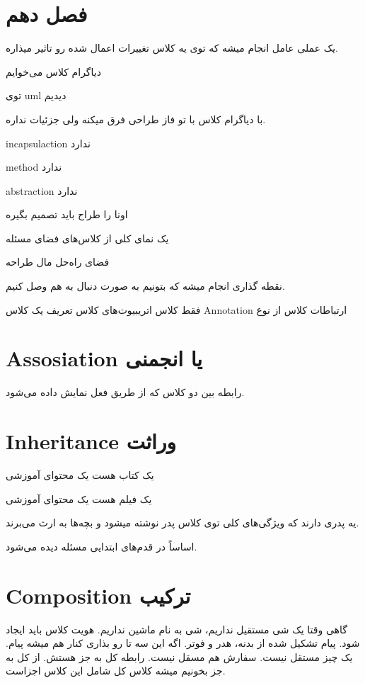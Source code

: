 \newpage

\section{فصل دهم}

یک عملی عامل انجام میشه که توی یه کلاس تغییرات اعمال شده رو تاثیر میذاره.

دیاگرام کلاس می‌خوایم

توی uml دیدیم

با دیاگرام کلاس با تو فاز طراحی فرق میکنه ولی جزئیات نداره.

incapsulaction ندارد

method ندارد

abstraction ندارد

اونا را طراح باید تصمیم بگیره

یک نمای کلی از کلاس‌های فضای مسئله

فضای راه‌حل مال طراحه

نقطه گذاری انجام میشه که بتونیم به صورت دنبال به هم وصل کنیم.

فقط کلاس
اتریبیوت‌های کلاس
تعریف یک کلاس Annotation
ارتباطات کلاس از نوع

\section{Assosiation یا انجمنی}

رابطه بین دو کلاس که از طریق فعل نمایش داده می‌شود.

\section{Inheritance وراثت}

یک کتاب هست یک محتوای آموزشی

یک فیلم هست یک محتوای آموزشی

یه پدری دارند که ویژگی‌های کلی توی کلاس پدر نوشته میشود و بچه‌ها به ارث می‌برند.

اساساً در قدم‌های ابتدایی مسئله دیده می‌شود.

\section{Composition ترکیب}

گاهی وقتا یک شی مستقیل نداریم، شی به نام ماشین نداریم. هویت کلاس باید ایجاد شود.
پیام تشکیل شده از بدنه، هدر و فوتر. اگه این سه تا رو بذاری کنار هم میشه پیام. یک
چیز مستقل نیست. سفارش هم مسقل نیست. رابطه کل به جز هستش. از کل به جز بخونیم میشه
کلاس کل شامل این کلاس اجزاست. 

